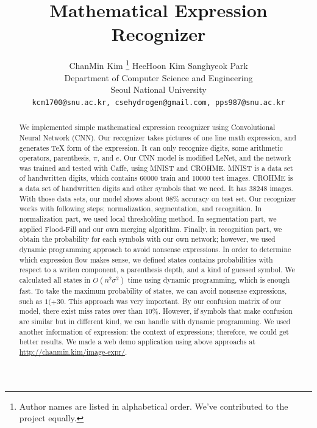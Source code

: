 \documentclass[10pt,twocolumn,letterpaper]{article}
\begin{document}
\title{Mathematical Expression Recognizer}

\author{ChanMin Kim
\thanks{
    Author names are listed in alphabetical order. We've contributed to the project equally.
}
\qquad HeeHoon Kim \qquad Sanghyeok Park\\
Department of Computer Science and Engineering\\
Seoul National University\\
{\tt\small kcm1700@snu.ac.kr, csehydrogen@gmail.com, pps987@snu.ac.kr}
}

\maketitle

\begin{abstract}
    We implemented simple mathematical expression recognizer using Convolutional Neural Network (CNN).
    Our recognizer takes pictures of one line math expression, and generates TeX form of the expression.
    It can only recognize digits, some arithmetic operators, parenthesis, $\pi$, and $e$.
    Our CNN model is modified LeNet, and the network was trained and tested with Caffe, using MNIST and CROHME.
    MNIST is a data set of handwritten digits, which contains 60000 train and 10000 test images.
    CROHME is a data set of handwritten digits and other symbols that we need. It has 38248 images.
    With those data sets, our model shows about 98\% accuracy on test set.
    Our recognizer works with following steps; normalization, segmentation, and recognition.
    In normalization part, we used local thresholding method.
    In segmentation part, we applied Flood-Fill and our own merging algorithm.
    Finally, in recognition part, we obtain the probability for each symbols with our own network;
    however, we used dynamic programming approach to avoid nonsense expressions.
    In order to determine which expression flow makes sense,
    we defined states contains probabilities with respect to a writen component, a parenthesis depth, and a kind of guessed symbol. %
    We calculated all states in $O(n^2 \sigma^2)$ time using dynamic programming, which is enough fast.
    To take the maximum probability of states, we can avoid nonsense expressions, such as $1(+30$.
    This approach was very important.
    By our confusion matrix of our model, there exist miss rates over than 10\%.
    However, if symbols that make confusion are similar but in different kind, we can handle with dynamic programming.
    We used another information of expression: the context of expressions; therefore, we could get better results.
    We made a web demo application using above approachs at \url{http://chanmin.kim/image-expr/}.
\end{abstract}
\end{document}
